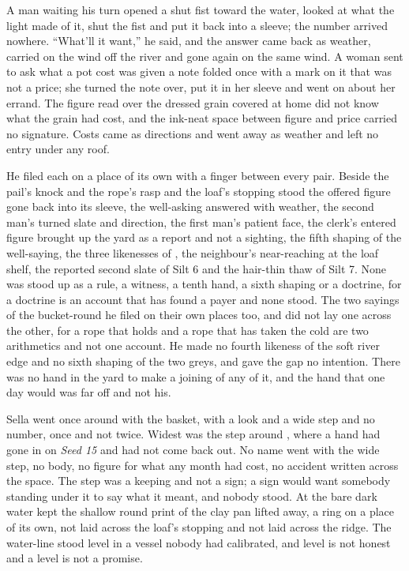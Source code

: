 A man waiting his turn opened a shut fist toward the water, looked at what the light made of it, shut the fist and put it back into a sleeve; the number arrived nowhere. “What'll it want,” he said, and the answer came back as weather, carried on the wind off the river and gone again on the same wind. A woman sent to ask what a pot cost was given a note folded once with a mark on it that was not a price; she turned the note over, put it in her sleeve and went on about her errand. The figure read over the dressed grain covered at home did not know what the grain had cost, and the ink-neat space between figure and price carried no signature. Costs came as directions and went away as weather and left no entry under any roof.

\scenebreak

He filed each on a place of its own with a finger between every pair. Beside the pail's knock and the rope's rasp and the loaf's stopping stood the offered figure gone back into its sleeve, the well-asking answered with weather, the second man's turned slate and direction, the first man's patient face, the clerk's entered figure brought up the yard as a report and not a sighting, the fifth shaping of the well-saying, the three likenesses of , the neighbour's near-reaching at the loaf shelf, the reported second slate of Silt 6 and the hair-thin thaw of Silt 7. None was stood up as a rule, a witness, a tenth hand, a sixth shaping or a doctrine, for a doctrine is an account that has found a payer and none stood. The two sayings of the bucket-round he filed on their own places too, and did not lay one across the other, for a rope that holds and a rope that has taken the cold are two arithmetics and not one account. He made no fourth likeness of the soft river edge and no sixth shaping of the two greys, and gave the gap no intention. There was no hand in the yard to make a joining of any of it, and the hand that one day would was far off and not his.

\scenebreak

Sella went once around  with the basket, with a look and a wide step and no number, once and not twice. Widest was the step around , where a hand had gone in on \emph{Seed 15} and had not come back out. No name went with the wide step, no body, no figure for what any month had cost, no accident written across the space. The step was a keeping and not a sign; a sign would want somebody standing under it to say what it meant, and nobody stood. At  the bare dark water kept the shallow round print of the clay pan lifted away, a ring on a place of its own, not laid across the loaf's stopping and not laid across the ridge. The water-line stood level in a vessel nobody had calibrated, and level is not honest and a level is not a promise.

